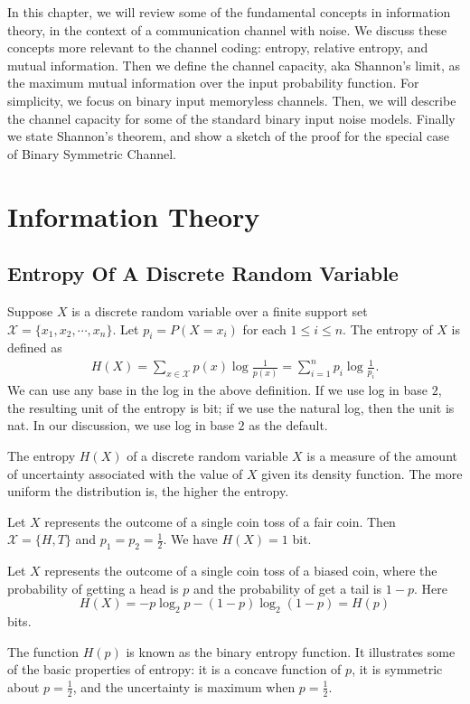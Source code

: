In this chapter, we will review some of the fundamental concepts in information theory, in the context of a communication channel with noise. We discuss these concepts more relevant to the channel coding: entropy, relative entropy, and mutual information. Then we define the channel capacity, aka Shannon's limit, as the maximum mutual information over the input probability function. For simplicity, we focus on binary input memoryless channels. Then, we will describe the channel capacity for some of the standard binary input noise models. Finally we state Shannon’s theorem, and show a sketch of the proof for the special case of Binary Symmetric Channel.

\section{Information Theory}
\subsection{Entropy Of A Discrete Random Variable}
Suppose \(X\) is a discrete random variable over a finite support set \(\mathcal{X} = \{x_1, x_2, \cdots, x_n\}\). Let \(p_i = P(X=x_i)\) for each \(1 \leq i \leq n\). The entropy of \(X\) is defined as 
\begin{align}
    H(X) = \sum_{x \in \mathcal{X}} p(x) \log \frac{1}{p(x)} = \sum_{i=1}^{n} p_i \log \frac{1}{p_i}.\label{eq:entropy}
\end{align}
We can use any base in the log in the above definition. If we use log in base \(2\), the resulting unit of the entropy is bit; if we use the natural log, then the unit is nat. In our discussion, we use log in base \(2\) as the default.

The entropy \(H(X)\) of a discrete random variable \(X\) is a measure of the amount of uncertainty associated with the value of \(X\) given its density function. The more uniform the distribution is, the higher the entropy.



\begin{example}
Let \(X\) represents the outcome of a single coin toss of a fair coin. Then \(\mathcal{X} = \{H, T\}\) and \(p_1 = p_2 = \frac{1}{2}\). We have \(H(X) = 1\) bit. 
\end{example}

\begin{example}
    Let \(X\) represents the outcome of a single coin toss of a biased coin, where the probability of getting a head is \(p\) and the probability of get a tail is \(1-p\). Here \[H(X) = -p\log_{2} p - (1-p) \log_{2} (1-p) = H(p)\] bits. 

    The function \(H(p)\) is known as the binary entropy function. It illustrates some of the basic properties of entropy: it is a concave function of \(p\), it is symmetric about \(p=\frac{1}{2}\), and the uncertainty is maximum when \(p=\frac{1}{2}.\)
\end{example}

